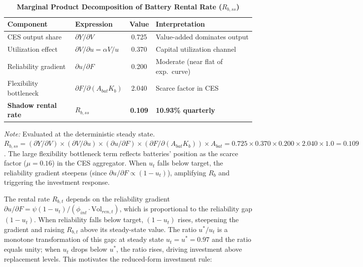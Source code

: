 \documentclass[12pt, a4paper]{article}
\begin{document}
	\begin{table}[H]
		\centering
		\caption{\textbf{Marginal Product Decomposition of Battery Rental Rate ($R_{b,ss}$)}}
		\label{tab:mpk_decomp}
		\renewcommand{\arraystretch}{1.3}
		\small
		\begin{tabular}{l l c l}
			\toprule
			\textbf{Component} & \textbf{Expression} & \textbf{Value} & \textbf{Interpretation} \\
			\midrule
			CES output share & $\partial Y / \partial V$ & 0.725 & Value-added dominates output \\
			Utilization effect & $\partial V / \partial u = \alpha V/u$ & 0.370 & Capital utilization channel \\
			Reliability gradient & $\partial u / \partial F$ & 0.200 & Moderate (near flat of exp.\ curve) \\
			Flexibility bottleneck & $\partial F / \partial (A_{bat} K_b)$ & 2.040 & Scarce factor in CES \\
			\midrule
			\textbf{Shadow rental rate} & $R_{b,ss}$ & \textbf{0.109} & \textbf{10.93\% quarterly} \\
			\bottomrule
		\end{tabular}
		\vspace{0.2cm}
		\parbox{\textwidth}{\footnotesize \textit{Note:} Evaluated at the deterministic steady state. $R_{b,ss} = (\partial Y/\partial V) \times (\partial V/\partial u) \times (\partial u/\partial F) \times (\partial F/\partial(A_{bat} K_b)) \times A_{bat} = 0.725 \times 0.370 \times 0.200 \times 2.040 \times 1.0 = 0.109$. The large flexibility bottleneck term reflects batteries' position as the scarce factor ($\mu = 0.16$) in the CES aggregator. When $u_t$ falls below target, the reliability gradient steepens (since $\partial u/\partial F \propto (1-u_t)$), amplifying $R_b$ and triggering the investment response.}
	\end{table}
	
	The rental rate $R_{b,t}$ depends on the reliability gradient $\partial u / \partial F = \psi(1-u_t)/(\phi_{int} \cdot \text{Vol}_{ren,t})$, which is proportional to the reliability gap $(1-u_t)$. When reliability falls below target, $(1-u_t)$ rises, steepening the gradient and raising $R_{b,t}$ above its steady-state value. The ratio $u^*/u_t$ is a monotone transformation of this gap: at steady state $u_t = u^* = 0.97$ and the ratio equals unity; when $u_t$ drops below $u^*$, the ratio rises, driving investment above replacement levels. This motivates the reduced-form investment rule:
	
\end{document}
